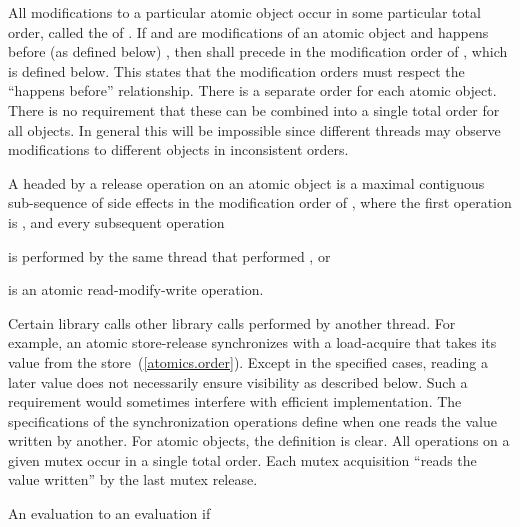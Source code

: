 \pnum
All modifications to a particular atomic object  occur in some
particular total order, called the  of . If
 and  are modifications of an atomic object  and
 happens before (as defined below) , then  shall precede
 in the modification order of , which is defined below.
\enternote This states that the modification orders must respect the ``happens
before'' relationship. \exitnote \enternote There is a separate order for each
atomic object. There is no requirement that these can be combined into a single
total order for all objects. In general this will be impossible since different
threads may observe modifications to different objects in inconsistent orders.
\exitnote

\pnum
A  headed by a release operation  on an atomic object
 is a maximal contiguous sub-sequence of
%
side effects in the
modification order of , where the first operation is , and
every subsequent operation

\begin{compactitem}
\item is performed by the same thread that performed , or
\item is an atomic read-modify-write operation.
\end{compactitem}

\pnum
Certain library calls  other library calls performed by
another thread. For example, an atomic store-release synchronizes with a
load-acquire that takes its value from the store~(\ref{atomics.order}).
\enternote Except in the specified cases, reading a later value does not
necessarily ensure visibility as described below. Such a requirement would
sometimes interfere with efficient implementation. \exitnote \enternote The
specifications of the synchronization operations define when one reads the value
written by another. For atomic objects, the definition is clear. All operations
on a given mutex occur in a single total order. Each mutex acquisition ``reads
the value written'' by the last mutex release. \exitnote

\pnum
An evaluation   to an evaluation  if

